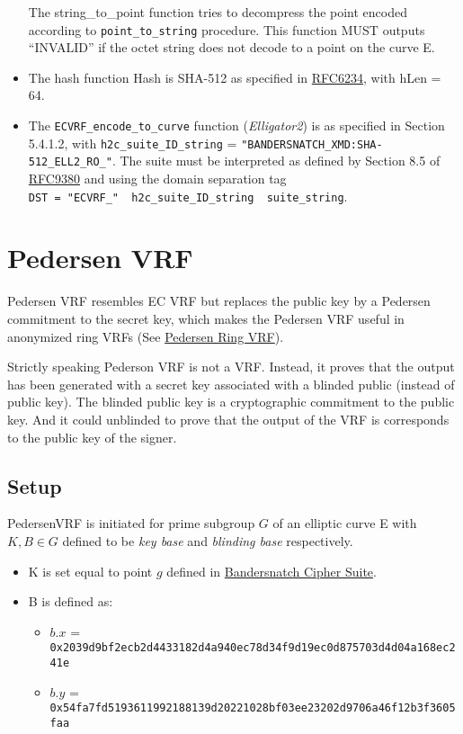 \documentclass[
]{article}
\providecommand{\tightlist}{%
  \setlength{\itemsep}{0pt}\setlength{\parskip}{0pt}}
\begin{document}
\begin{itemize}
  The string\_to\_point function tries to decompress the point encoded
  according to \texttt{point\_to\_string} procedure. This function MUST
  outputs ``INVALID'' if the octet string does not decode to a point on
  the curve E.
\item
  The hash function Hash is SHA-512 as specified in
  \href{https://www.rfc-editor.org/rfc/rfc6234}{RFC6234}, with hLen =
  64.
\item
  The \texttt{ECVRF\_encode\_to\_curve} function (\emph{Elligator2}) is
  as specified in Section 5.4.1.2, with \texttt{h2c\_suite\_ID\_string}
  = \texttt{"BANDERSNATCH\_XMD:SHA-512\_ELL2\_RO\_"}. The suite must be
  interpreted as defined by Section 8.5 of
  \href{https://datatracker.ietf.org/doc/rfc9380/}{RFC9380} and using
  the domain separation tag
  \texttt{DST\ =\ "ECVRF\_"\ \textbar{}\textbar{}\ h2c\_suite\_ID\_string\ \textbar{}\textbar{}\ suite\_string}.
\end{itemize}

\hypertarget{pedersen-vrf}{%
\section{Pedersen VRF}\label{pedersen-vrf}}

Pedersen VRF resembles EC VRF but replaces the public key by a Pedersen
commitment to the secret key, which makes the Pedersen VRF useful in
anonymized ring VRFs (See \protect\hyperlink{pedersen-ring-vrf}{Pedersen
Ring VRF}).

Strictly speaking Pederson VRF is not a VRF. Instead, it proves that the
output has been generated with a secret key associated with a blinded
public (instead of public key). The blinded public key is a
cryptographic commitment to the public key. And it could unblinded to
prove that the output of the VRF is corresponds to the public key of the
signer.

\hypertarget{setup-1}{%
\subsection{Setup}\label{setup-1}}

PedersenVRF is initiated for prime subgroup \(G\) of an elliptic curve E
with \(K, B \in G\) defined to be \emph{key base} and \emph{blinding
base} respectively.

\begin{itemize}
\tightlist
\item
  K is set equal to point \(g\) defined in
  \protect\hyperlink{bandersnatch-cipher-suite}{Bandersnatch Cipher
  Suite}.
\item
  B is defined as:

  \begin{itemize}
  \tightlist
  \item
    \(b.x\) =
    \texttt{0x2039d9bf2ecb2d4433182d4a940ec78d34f9d19ec0d875703d4d04a168ec241e}
  \item
    \(b.y\) =
    \texttt{0x54fa7fd5193611992188139d20221028bf03ee23202d9706a46f12b3f3605faa}
  \end{itemize}
\end{itemize}
\end{document}
